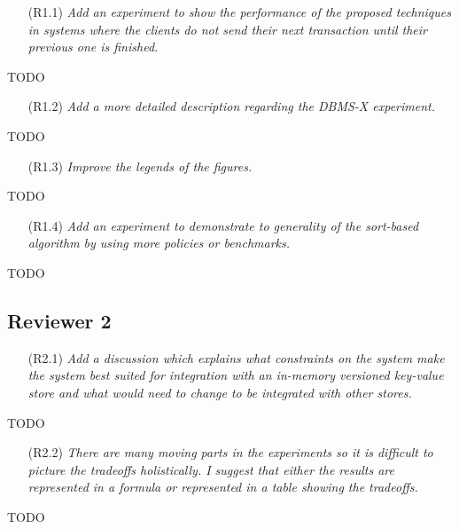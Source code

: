 \documentclass{article}
\newcommand{\changed}[1]{#1}
\newcommand{\changed}[1]{{\color{blue}#1}}
\begin{document}
\begin{itemize}
\item[(R1.1)] \emph{Add an experiment to show the performance of the proposed techniques in systems where the clients do not send their next transaction until their previous one is finished.}
\end{itemize}
\changed{
	TODO
}

\begin{itemize}
\item[(R1.2)] \emph{Add a more detailed description regarding the DBMS-X experiment.}
\end{itemize}

\changed{
	TODO
}

\begin{itemize}
\item[(R1.3)] \emph{Improve the legends of the figures.}
\end{itemize}

\changed{
	TODO
}

\begin{itemize}
\item[(R1.4)] \emph{Add an experiment to demonstrate to generality of the sort-based algorithm by using more policies or benchmarks.}
\end{itemize}

\changed{
	TODO
}

\subsection{Reviewer 2}

\begin{itemize}
\item[(R2.1)] \emph{Add a discussion which explains what constraints on the system make the system best suited for integration with an in-memory versioned key-value store and what would need to change to be integrated with other stores.}
\end{itemize}

\changed{
	TODO
}

\begin{itemize}
\item[(R2.2)] \emph{There are many moving parts in the experiments so it is difficult to picture the tradeoffs holistically. I suggest that either the results are represented in a formula or represented in a table showing the tradeoffs.}
\end{itemize}

\changed{
	TODO
}
\end{document}
